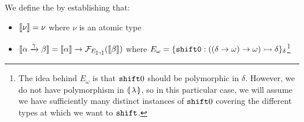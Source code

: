 \begin{definition}
  We define the  by establishing that:

  \begin{itemize}
  \item $\llbracket \nu \rrbracket = \nu$ where $\nu$ is an atomic type
  \item $\llbracket \alpha \xrightarrow{\gamma} \beta \rrbracket = \llbracket \alpha \rrbracket \to
    \mathcal{F}_{E_{\llbracket \gamma \rrbracket}}(\llbracket \beta \rrbracket)$ where $E_\omega = \{
    \mathtt{shift0} : ((\delta \to \omega) \to \omega) \rightarrowtail \delta
    \}_\delta$\footnote{The idea behind $E_\omega$ is that $\mathtt{shift}0$ should
      be polymorphic in $\delta$. However, we do not have polymorphism in
      $\llparenthesis \, \lambda \, \rrparenthesis$, so in this particular case, we will assume we
      have sufficiently many distinct instances of $\mathtt{shift}0$ covering the
      different types at which we want to $\mathtt{shift}$.}
  \end{itemize}
\end{definition}


